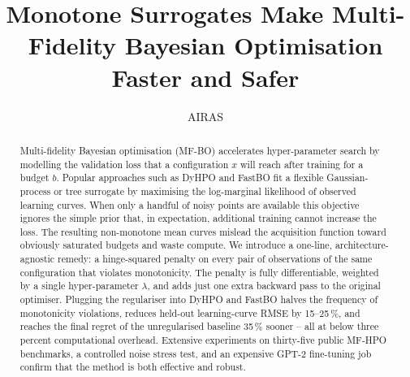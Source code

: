 \title{Monotone Surrogates Make Multi-Fidelity Bayesian Optimisation Faster and Safer}

\author{AIRAS}

\newcommand{\fix}{\marginpar{FIX}}
\newcommand{\new}{\marginpar{NEW}}



\maketitle

\begin{abstract}
Multi-fidelity Bayesian optimisation (MF-BO) accelerates hyper-parameter search by modelling the validation loss that a configuration $x$ will reach after training for a budget $b$. Popular approaches such as DyHPO and FastBO fit a flexible Gaussian-process or tree surrogate by maximising the log-marginal likelihood of observed learning curves. When only a handful of noisy points are available this objective ignores the simple prior that, in expectation, additional training cannot increase the loss. The resulting non-monotone mean curves mislead the acquisition function toward obviously saturated budgets and waste compute. We introduce a one-line, architecture-agnostic remedy: a hinge-squared penalty on every pair of observations of the same configuration that violates monotonicity. The penalty is fully differentiable, weighted by a single hyper-parameter $\lambda$, and adds just one extra backward pass to the original optimiser. Plugging the regulariser into DyHPO and FastBO halves the frequency of monotonicity violations, reduces held-out learning-curve RMSE by 15--25\,\%, and reaches the final regret of the unregularised baseline 35\,\% sooner -- all at below three percent computational overhead. Extensive experiments on thirty-five public MF-HPO benchmarks, a controlled noise stress test, and an expensive GPT-2 fine-tuning job confirm that the method is both effective and robust.
\end{abstract}





